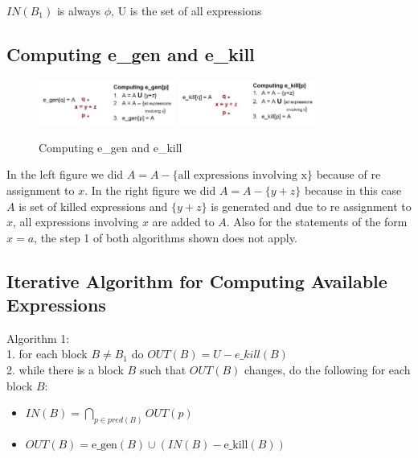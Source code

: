 \documentclass{article}
\begin{document}
$IN(B_1)$ is always $\phi$, U is the set of all expressions 

\subsection*{Computing e\_gen and e\_kill}

\begin{figure}[h]
    \centering
    \includegraphics[width=0.4\textwidth]{Images/egen.png}
    \includegraphics[width=0.4\textwidth]{Images/ekill.png}
    \caption{Computing e\_gen and e\_kill}
    \label{fig:AvailableExpressions}

\end{figure}

In the left figure we did $A = A - \{ \text{all expressions involving x} \}$ because of re assignment to $x$. In the right figure we did $A = A - \{y+z\}$ because in this case $A$ is set of killed expressions and $\{y+z\}$ is generated and due to re assignment to $x$, all expressions involving $x$ are added to $A$. Also for the statements of the form $x=a$, the step 1 of both algorithms shown does not apply. \\

\subsection*{Iterative Algorithm for Computing Available Expressions}
Algorithm 1: \\
1. for each block $B \neq B_1$ do $OUT(B) = U - e\_kill(B)$ \\
2. while there is a block $B$ such that $OUT(B)$ changes, do the following for each block $B$: \\

\begin{itemize}
    \item $IN(B) = \bigcap_{p \in pred(B)} OUT(p)$
    \item $OUT(B) = \text{e\_gen}(B) \cup (IN(B) - \text{e\_kill}(B))$
\end{itemize}
\end{document}
